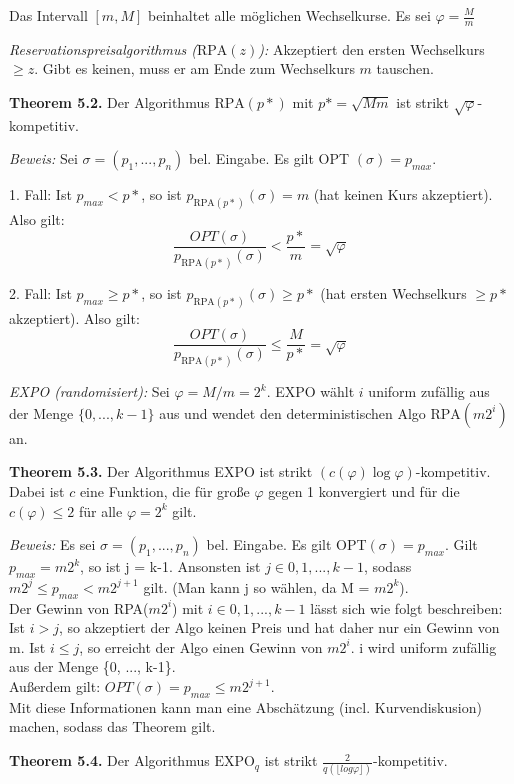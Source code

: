 Das Intervall $[m, M]$ beinhaltet alle möglichen Wechselkurse. Es sei $\varphi = \frac{M}{m}$

\textit{Reservationspreisalgorithmus ($\textrm{RPA}(z)$):} Akzeptiert den ersten Wechselkurs $\ge z$. Gibt es keinen, muss er am Ende zum Wechselkurs $m$ tauschen.

\textbf{Theorem 5.2.} Der Algorithmus $\textrm{RPA}(p*)$ mit $p* = \sqrt{Mm}$ ist strikt $\sqrt{\varphi}$-kompetitiv.

\textit{Beweis:} Sei $\sigma = (p_{1}, ..., p_{n})$ bel. Eingabe. Es gilt OPT $(\sigma) = p_{max}$.

1. Fall: Ist $p_{max} < p*$, so ist $p_{\textrm{RPA}(p*)}(\sigma) = m$ (hat keinen Kurs akzeptiert). Also gilt: $$\frac{OPT(\sigma)}{p_{\textrm{RPA}(p*)}(\sigma)} < \frac{p*}{m} = \sqrt{\varphi}$$

2. Fall: Ist $p_{max} \ge p*$, so ist $p_{\textrm{RPA}(p*)}(\sigma) \ge p*$ (hat ersten Wechselkurs $\ge p*$ akzeptiert). Also gilt: $$\frac{OPT(\sigma)}{p_{\textrm{RPA}(p*)}(\sigma)} \le \frac{M}{p*} = \sqrt{\varphi}$$

\textit{EXPO (randomisiert):} Sei $\varphi = M / m = 2^k$. EXPO wählt $i$ uniform zufällig aus der Menge $\{0, ..., k - 1\}$ aus und wendet den deterministischen Algo $\textrm{RPA}(m2^{i})$ an.

\textbf{Theorem 5.3.} Der Algorithmus EXPO ist strikt $(c(\varphi)\log\varphi)$-kompetitiv. Dabei ist $c$ eine Funktion, die für große $\varphi$ gegen 1 konvergiert und für die $c(\varphi) \le 2$ für alle $\varphi = 2^k$ gilt.

\textit{Beweis:} Es sei $\sigma = (p_{1}, ..., p_{n})$ bel. Eingabe. Es gilt OPT$(\sigma) = p_{max}$. Gilt $p_{max} = m2^{k}$, so ist j = k-1. Ansonsten ist $j \in {0, 1, ..., k-1}$, sodass $m2^{j} \le p_{max} < m2^{j+1}$ gilt. (Man kann j so wählen, da M = $m2^{k}$).\\
Der Gewinn von RPA($m2^{i}$) mit $i \in {0, 1, ..., k-1}$ lässt sich wie folgt beschreiben: Ist $i > j$, so akzeptiert der Algo keinen Preis und hat daher nur ein Gewinn von m. Ist $i \le j$, so erreicht der Algo einen Gewinn von $m2^{i}$. i wird uniform zufällig aus der Menge \{0, ..., k-1\}.\\
Außerdem gilt: $OPT(\sigma) = p_{max} \le m2^{j+1}$.\\
Mit diese Informationen kann man eine Abschätzung (incl. Kurvendiskusion) machen, sodass das Theorem gilt.

\textbf{Theorem 5.4.} Der Algorithmus $\textrm{EXPO}_{q}$ ist strikt $\frac{2}{q(\lfloor log\varphi \rfloor)}$-kompetitiv.

